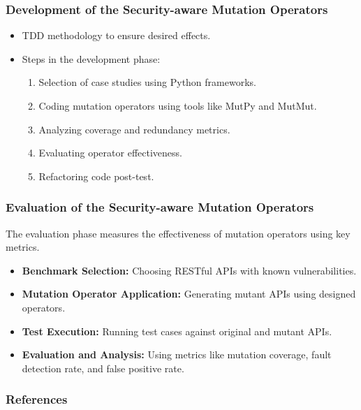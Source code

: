 \documentclass[10pt]{beamer}
\theoremstyle{remark}
\theoremstyle{definition}
\begin{document}
\begin{frame}
    \frametitle{Development of the Security-aware Mutation Operators}
    \begin{itemize}
        \item TDD methodology to ensure desired effects.
        \item Steps in the development phase:
        \begin{enumerate}
            \item Selection of case studies using Python frameworks.
            \item Coding mutation operators using tools like MutPy and MutMut.
            \item Analyzing coverage and redundancy metrics.
            \item Evaluating operator effectiveness.
            \item Refactoring code post-test.
        \end{enumerate}
    \end{itemize}
\end{frame}

\begin{frame}
    \frametitle{Evaluation of the Security-aware Mutation Operators}
    The evaluation phase measures the effectiveness of mutation operators using key metrics.
    \begin{itemize}
        \item \textbf{Benchmark Selection:} Choosing RESTful APIs with known vulnerabilities.
        \item \textbf{Mutation Operator Application:} Generating mutant APIs using designed operators.
        \item \textbf{Test Execution:} Running test cases against original and mutant APIs.
        \item \textbf{Evaluation and Analysis:} Using metrics like mutation coverage, fault detection rate, and false positive rate.
    \end{itemize}
\end{frame}

\begin{frame}[allowframebreaks]
\frametitle{References}
  \printbibliography
\end{frame}
\end{document}
